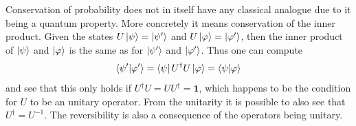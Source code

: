 Conservation of probability does not in itself have any classical analogue due to it being a quantum property. More concretely it means conservation of the inner product. Given the states $U\ket{\psi} = \ket{\psi'}$ and $U\ket{\varphi} = \ket{\varphi'}$, then the inner product of $\ket{\psi}$ and $\ket{\varphi}$ is the same as for $\ket{\psi'}$ and $\ket{\varphi'}$. Thus one can compute
\begin{equation}
\bra{\psi'}\ket{\varphi'} = \bra{\psi}U^\dagger U\ket{\varphi} = \bra{\psi}\ket{\varphi}
\end{equation}
and see that this only holds if $U^\dagger U = UU^\dagger = \mathbf{1}$, which happens to be the condition for $U$ to be an unitary operator. From the unitarity it is possible to also see that $U^\dagger = U^{-1}$. The reversibility is also a consequence of the operators being unitary.
